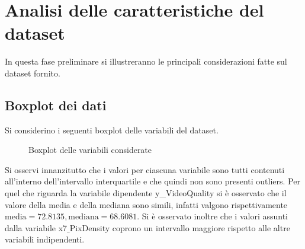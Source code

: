 \section{Analisi delle caratteristiche del dataset}
In questa fase preliminare si illustreranno le principali considerazioni fatte sul dataset fornito.
\subsection{Boxplot dei dati}
Si considerino i seguenti boxplot delle variabili del dataset.
\begin{figure}[H]
	\centering
	\caption{Boxplot delle variabili considerate}
\end{figure}

Si osservi innanzitutto che i valori per ciascuna variabile sono tutti contenuti all'interno dell'intervallo interquartile e che quindi non sono presenti outliers. Per quel che riguarda la variabile dipendente y\_VideoQuality si è osservato che il valore della media e della mediana sono simili, infatti valgono rispettivamente  $\text{media}=72.8135, \text{mediana}=68.6081$. Si è osservato inoltre che i valori assunti dalla variabile x7$\_$PixDensity coprono un intervallo maggiore rispetto alle altre variabili indipendenti. 
